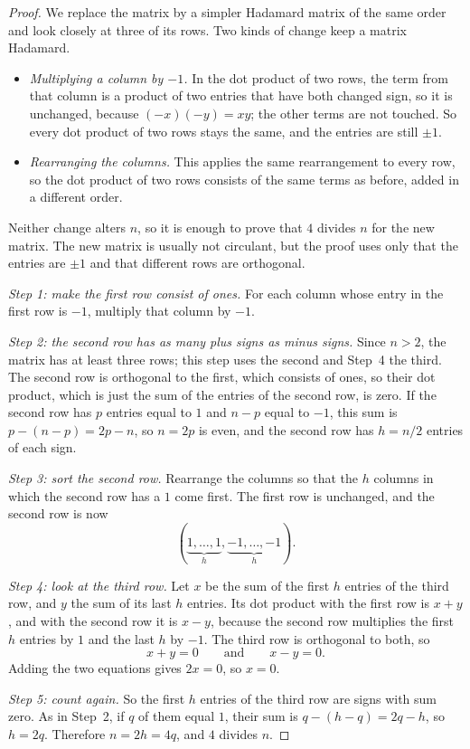 \begin{proof}
We replace the matrix by a simpler Hadamard matrix of the same order and look closely at three of its rows. Two kinds of change keep a matrix Hadamard.
\begin{itemize}
\item \emph{Multiplying a column by $-1$.} In the dot product of two rows, the term from that column is a product of two entries that have both changed sign, so it is unchanged, because $(-x)(-y)=xy$; the other terms are not touched. So every dot product of two rows stays the same, and the entries are still $\pm1$.
\item \emph{Rearranging the columns.} This applies the same rearrangement to every row, so the dot product of two rows consists of the same terms as before, added in a different order.
\end{itemize}
Neither change alters $n$, so it is enough to prove that $4$ divides $n$ for the new matrix. The new matrix is usually not circulant, but the proof uses only that the entries are $\pm1$ and that different rows are orthogonal.

\emph{Step 1: make the first row consist of ones.} For each column whose entry in the first row is $-1$, multiply that column by $-1$.

\emph{Step 2: the second row has as many plus signs as minus signs.} Since $n>2$, the matrix has at least three rows; this step uses the second and Step~4 the third. The second row is orthogonal to the first, which consists of ones, so their dot product, which is just the sum of the entries of the second row, is zero. If the second row has $p$ entries equal to $1$ and $n-p$ equal to $-1$, this sum is $p-(n-p)=2p-n$, so $n=2p$ is even, and the second row has $h=n/2$ entries of each sign.

\emph{Step 3: sort the second row.} Rearrange the columns so that the $h$ columns in which the second row has a $1$ come first. The first row is unchanged, and the second row is now
\[
(\underbrace{1,\ldots,1}_{h},\underbrace{-1,\ldots,-1}_{h}).
\]

\emph{Step 4: look at the third row.} Let $x$ be the sum of the first $h$ entries of the third row, and $y$ the sum of its last $h$ entries. Its dot product with the first row is $x+y$, and with the second row it is $x-y$, because the second row multiplies the first $h$ entries by $1$ and the last $h$ by $-1$. The third row is orthogonal to both, so
\[
x+y=0\qquad\text{and}\qquad x-y=0.
\]
Adding the two equations gives $2x=0$, so $x=0$.

\emph{Step 5: count again.} So the first $h$ entries of the third row are signs with sum zero. As in Step~2, if $q$ of them equal $1$, their sum is $q-(h-q)=2q-h$, so $h=2q$. Therefore $n=2h=4q$, and $4$ divides $n$.
\end{proof}

